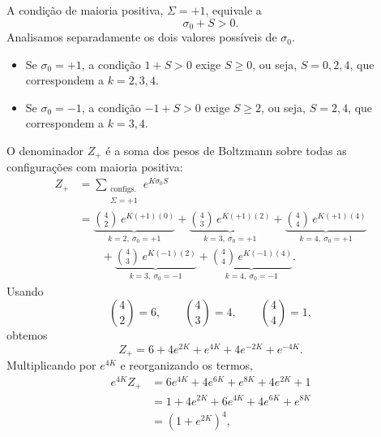\documentclass[12pt,a4paper]{article}
\begin{document}
%
A condição de maioria positiva, \(\Sigma=+1\), equivale a
%
\begin{equation}
    \sigma_0+S>0.
\end{equation}
%
Analisamos separadamente os dois valores possíveis de \(\sigma_0\).
%
\begin{itemize}
    \item Se \(\sigma_0=+1\), a condição \(1+S>0\) exige \(S\ge0\),
    ou seja, \(S=0,2,4\), que correspondem a \(k=2,3,4\).

    \item Se \(\sigma_0=-1\), a condição \(-1+S>0\) exige \(S\ge2\),
    ou seja, \(S=2,4\), que correspondem a \(k=3,4\).
\end{itemize}
%
O denominador \(Z_+\) é a soma dos pesos de Boltzmann sobre todas as
configurações com maioria positiva:
%
\begin{align}
    Z_+
    &=
    \sum_{\substack{\text{configs.}\\\Sigma=+1}}
    e^{K\sigma_0 S}
    \nonumber\\[4pt]
    &=
    \underbrace{
        \binom{4}{2}\,e^{K(+1)(0)}
    }_{k=2,\ \sigma_0=+1}
    +
    \underbrace{
        \binom{4}{3}\,e^{K(+1)(2)}
    }_{k=3,\ \sigma_0=+1}
    +
    \underbrace{
        \binom{4}{4}\,e^{K(+1)(4)}
    }_{k=4,\ \sigma_0=+1}
    \nonumber\\[4pt]
    &\qquad
    +
    \underbrace{
        \binom{4}{3}\,e^{K(-1)(2)}
    }_{k=3,\ \sigma_0=-1}
    +
    \underbrace{
        \binom{4}{4}\,e^{K(-1)(4)}
    }_{k=4,\ \sigma_0=-1}.
    \label{eq:Zplus_sum_p3}
\end{align}
%
Usando
%
\begin{equation}
    \binom{4}{2}=6,
    \qquad
    \binom{4}{3}=4,
    \qquad
    \binom{4}{4}=1,
\end{equation}
%
obtemos
%
\begin{equation}
    Z_+
    =
    6
    +
    4e^{2K}
    +
    e^{4K}
    +
    4e^{-2K}
    +
    e^{-4K}.
    \label{eq:Zplus_p3}
\end{equation}
%
Multiplicando por \(e^{4K}\) e reorganizando os termos,
%
\begin{align}
    e^{4K}Z_+
    &=
    6e^{4K}
    +
    4e^{6K}
    +
    e^{8K}
    +
    4e^{2K}
    +
    1
    \nonumber\\[4pt]
    &=
    1+4e^{2K}+6e^{4K}+4e^{6K}+e^{8K}
    \nonumber\\[4pt]
    &=
    \left(1+e^{2K}\right)^4,
    \label{eq:Zplus_factored_p3}
\end{align}
\end{document}
